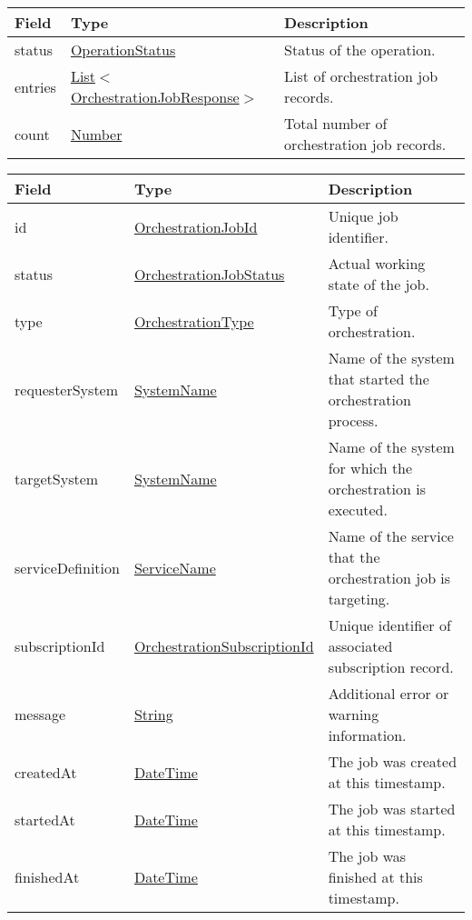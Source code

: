 \documentclass[a4paper]{arrowhead}
\newcommand{\pref}[1]{{\textcolor{ArrowheadGrey}{\hyperref[sec:model:primitives:#1]{#1}}}}
\begin{document}

\begin{table}[ht!]
\begin{tabularx}{\textwidth}{| p{3cm} | p{6.5cm} | X |} \hline
\rowcolor{gray!33} Field & Type & Description \\ \hline
status & \pref{OperationStatus} & Status of the operation. \\ \hline
entries & \pref{List}$<$\hyperref[sec:model:OrchestrationJobResponse]{OrchestrationJobResponse}$>$ & List of orchestration job records. \\ \hline
count & \pref{Number} & Total number of orchestration job records. \\ \hline
\end{tabularx}
\end{table}


\begin{table}[ht!]
\begin{tabularx}{\textwidth}{| p{2.8cm} | p{4.5cm} | X |} \hline
\rowcolor{gray!33} Field & Type & Description \\ \hline
id & \pref{OrchestrationJobId} & Unique job identifier. \\ \hline
status & \pref{OrchestrationJobStatus} & Actual working state of the job. \\ \hline
type & \pref{OrchestrationType} & Type of orchestration. \\ \hline
requesterSystem & \pref{SystemName} & Name of the system that started the orchestration process. \\ \hline
targetSystem & \pref{SystemName} & Name of the system for which the orchestration is executed. \\ \hline
serviceDefinition & \pref{ServiceName} & Name of the service that the orchestration job is targeting. \\ \hline
subscriptionId & \pref{OrchestrationSubscriptionId} & Unique identifier of associated subscription record. \\ \hline
message & \pref{String} & Additional error or warning information. \\ \hline
createdAt & \pref{DateTime} & The job was created at this timestamp. \\ \hline
startedAt & \pref{DateTime} & The job was started at this timestamp. \\ \hline
finishedAt & \pref{DateTime} & The job was finished at this timestamp. \\ \hline
\end{tabularx}
\end{table}
\end{document}
